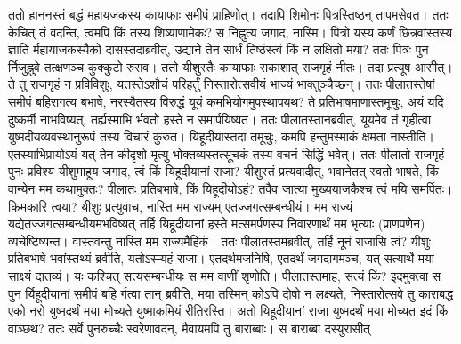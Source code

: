 \vakya ततो हाननस्तं बद्धं महायजकस्य कायाफाः समीपं प्राहिणोत्।
\vakya तदापि शिमोनः पित्रस्तिष्ठन् तापमसेवत। ततः केचित् तं वदन्ति, त्वमपि किं तस्य शिष्याणामेकः? स निह्नुत्य जगाद, नास्मि।
\vakya पित्रो यस्य कर्णं छिन्नवांस्तस्य ज्ञाति र्महायाजकस्यैको दासस्तदाब्रवीत्, उद्याने तेन सार्धं तिष्ठंस्त्वं किं न लक्षितो मया?
\vakya ततः पित्रः पुन र्निजुह्नुवे तत्क्षणञ्च कुक्कुटो रुराव।
\vakya ततो यीशुस्तैः कायाफाः सकाशात् राजगृहं नीतः। तदा प्रत्यूष आसीत्। ते तु राजगृहं न प्रविविशुः, यतस्तेऽशौचं परिहर्तुं निस्तारोत्सवीयं भाज्यं भाक्तुञ्चैच्छन्।
\vakya ततः पीलातस्तेषां समीपं बहिरागत्य बभाषे, नरस्यैतस्य विरुद्धं यूयं कमभियोगमुपस्थापयथ?
\vakya ते प्रतिभाषमाणास्तमूचुः, अयं यदि दुष्कर्मी नाभविष्यत्, तर्ह्यस्माभि र्भवतो हस्ते न समार्पयिष्यत।
\vakya ततः पीलातस्तानब्रवीत्, यूयमेव तं गृहीत्वा युष्मदीयव्यवस्थानुरूपं तस्य विचारं कुरुत। यिहूदीयास्तदा तमूचुः, कमपि हन्तुमस्माकं क्षमता नास्तीति।
\vakya एतस्याभिप्रायोऽयं यत् तेन कीदृशो मृत्यु भोक्तव्यस्तत्सूचकं तस्य वचनं सिद्धिं भवेत्।
\vakya ततः पीलातो राजगृहं पुनः प्रविश्य यीशुमाहूय जगाद, त्वं किं यिहूदीयानां राजा?
\vakya यीशुस्तं प्रत्यवादीत्, भवानेतत् स्वतो भाषते, किं वान्येन मम कथामुक्तः?
\vakya पीलातः प्रतिबभाषे, किं यिहूदीयोऽहं? तवैव जात्या मुख्ययाजकैश्च त्वं मयि समर्पितः। किमकारि त्वया?
\vakya यीशुः प्रत्युवाच, नास्ति मम राज्यम् एतज्जगत्सम्बन्धीयं। मम राज्यं यद्येतज्जगत्सम्बन्धीयमभविष्यत् तर्हि यिहूदीयानां हस्ते मत्समर्पणस्य निवारणार्थं मम भृत्याः (प्राणपणेन) व्यचेष्टिष्यन्त। वास्तवन्तु नास्ति मम राज्यमैहिकं।
\vakya ततः पीलातस्तमब्रवीत्, तर्हि नूनं राजासि त्वं? यीशुः प्रतिबभाषे भवांस्तथ्यं ब्रवीति, यतोऽस्म्यहं राजा। एतदर्थमजनिषि, एतदर्थं जगदागमञ्च, यत् सत्यार्थे मया साक्ष्यं दातव्यं। यः कश्चित् सत्यसम्बन्धीयः स मम वाणीं शृणोति।
\vakya पीलातस्तमाह, सत्यं किं? इदमुक्त्वा स पुन र्यिहूदीयानां समीपं बहि र्गत्वा तान् ब्रवीति, मया तस्मिन् कोऽपि दोषो न लक्ष्यते,
\vakya निस्तारोत्सवे तु काराबद्ध एको नरो युष्मदर्थं मया मोच्यते युष्माकमियं रीतिरस्ति। अतो यिहूदीयानां राजा युष्मदर्थं मया मोच्यत इदं किं वाञ्छथ?
\vakya ततः सर्वे पुनरुच्चैः स्वरेणावदन्, मैवायमपि तु बाराब्बाः। स बाराब्बा दस्युरासीत्\eoc